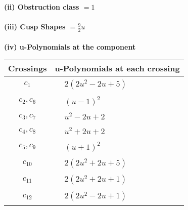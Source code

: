\documentclass[1p]{elsarticle_modified}
\theoremstyle{definition}
\begin{document}
\flushleft \textbf{(ii) Obstruction class $= 1$}\\~\\
\flushleft \textbf{(iii) Cusp Shapes $= \frac{9}{2} u$}\\~\\
\newpage\renewcommand{\arraystretch}{1}
\flushleft \textbf{(iv) u-Polynomials at the component}\newline \\
\begin{tabular}{m{50pt}|m{274pt}}
Crossings & \hspace{64pt}u-Polynomials at each crossing \\
\hline $$\begin{aligned}c_{1}\end{aligned}$$&$\begin{aligned}
&2(2 u^2-2 u+5)
\end{aligned}$\\
\hline $$\begin{aligned}c_{2},c_{6}\end{aligned}$$&$\begin{aligned}
&(u-1)^2
\end{aligned}$\\
\hline $$\begin{aligned}c_{3},c_{7}\end{aligned}$$&$\begin{aligned}
&u^2-2 u+2
\end{aligned}$\\
\hline $$\begin{aligned}c_{4},c_{8}\end{aligned}$$&$\begin{aligned}
&u^2+2 u+2
\end{aligned}$\\
\hline $$\begin{aligned}c_{5},c_{9}\end{aligned}$$&$\begin{aligned}
&(u+1)^2
\end{aligned}$\\
\hline $$\begin{aligned}c_{10}\end{aligned}$$&$\begin{aligned}
&2(2 u^2+2 u+5)
\end{aligned}$\\
\hline $$\begin{aligned}c_{11}\end{aligned}$$&$\begin{aligned}
&2(2 u^2+2 u+1)
\end{aligned}$\\
\hline $$\begin{aligned}c_{12}\end{aligned}$$&$\begin{aligned}
&2(2 u^2-2 u+1)
\end{aligned}$\\
\hline
\end{tabular}\\~\\
\end{document}
